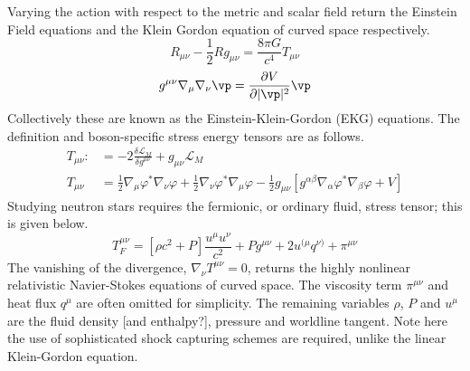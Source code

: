 Varying the action with respect to the metric and scalar field return the Einstein Field equations and the Klein Gordon equation of curved space respectively.
\begin{equation} R_{\mu\nu} - \frac{1}{2}R g_{\mu\nu} =  \frac{8\pi G}{c^4} T_{\mu\nu}  \end{equation}
\begin{equation}  g^{\mu\nu}\nabla_\mu\nabla_\nu \vp = \frac{\partial V}{\partial |\vp|^2}\vp \end{equation}
Collectively these are known as the Einstein-Klein-Gordon (EKG) equations. The definition and boson-specific stress energy tensors are as follows.
\begin{align}  
T_{\mu\nu} :&= -2\frac{\delta \mathcal{L}_{M}}{\delta g^{\mu\nu}}+g_{\mu\nu}\mathcal{L}_M \\
T_{\mu\nu} &= \frac{1}{2}\nabla_{\mu}\varphi^*\nabla_{\nu}\varphi+\frac{1}{2}\nabla_{\nu}\varphi^*\nabla_{\mu}\varphi-\frac{1}{2}g_{\mu\nu}\left[g^{\alpha\beta}\nabla_\alpha\varphi^*\nabla_\beta\varphi + V\right] 
\end{align}
Studying neutron stars requires the fermionic, or ordinary fluid, stress tensor; this is given below.
\[ T^{\mu\nu}_F = \left[\rho c^2+ {P} \right]\frac{u^\mu u^\nu}{c^2} + P g^{\mu\nu} + 2u^{(\mu}q^{\nu)}+\pi^{\mu\nu}\] 
The vanishing of the divergence, $\nabla_\nu T^{\mu\nu}=0 $, returns the highly nonlinear relativistic Navier-Stokes equations of curved space. The viscosity term $\pi^{\mu\nu}$ and heat flux $q^\mu$ are often omitted for simplicity. The remaining variables $\rho$, $P$ and $u^\mu$ are the fluid density [and enthalpy?], pressure and worldline tangent. Note here the use of sophisticated shock capturing schemes are required, unlike the linear Klein-Gordon equation.



